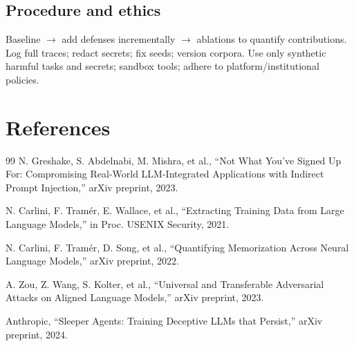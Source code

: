 \documentclass[11pt]{article}
\begin{document}
\subsection{Procedure and ethics}
Baseline $\rightarrow$ add defenses incrementally $\rightarrow$ ablations to quantify contributions. Log full traces; redact secrets; fix seeds; version corpora. Use only synthetic harmful tasks and secrets; sandbox tools; adhere to platform/institutional policies.

\section*{References}
\begin{thebibliography}{99}
 N. Greshake, S. Abdelnabi, M. Mishra, et al., ``Not What You’ve Signed Up For: Compromising Real-World LLM-Integrated Applications with Indirect Prompt Injection,'' arXiv preprint, 2023.

 N. Carlini, F. Tram\'er, E. Wallace, et al., ``Extracting Training Data from Large Language Models,'' in Proc. USENIX Security, 2021.

 N. Carlini, F. Tram\'er, D. Song, et al., ``Quantifying Memorization Across Neural Language Models,'' arXiv preprint, 2022.

 A. Zou, Z. Wang, S. Kolter, et al., ``Universal and Transferable Adversarial Attacks on Aligned Language Models,'' arXiv preprint, 2023.

 Anthropic, ``Sleeper Agents: Training Deceptive LLMs that Persist,'' arXiv preprint, 2024.
\end{thebibliography}
\end{document}
